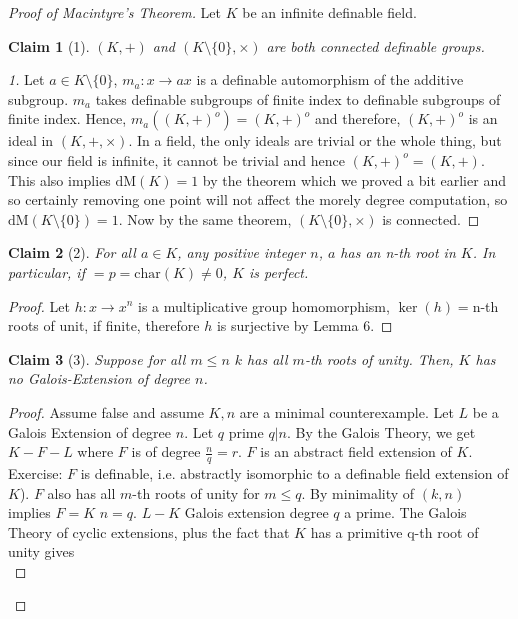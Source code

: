\documentclass[letterpaper, 12pt]{article}
\newcommand{\dM}{\mbox{dM}}
\theoremstyle{stdthm}
\theoremstyle{stddef}
\theoremstyle{stdnonum}
\newtheorem{claim}{Claim}
\theoremstyle{stdqands}
\theoremstyle{stdbold}
\begin{document}
\begin{proof}[Proof of Macintyre's Theorem]
Let $K$ be an infinite definable field. 

\begin{claim}[1]
$(K,+)$ and $(K\setminus\{0\},\times)$ are both connected definable groups. 
\end{claim}

\begin{proof}[1]
Let $a \in K\setminus\{0\}$, $m_a: x\to ax$ is a definable automorphism of the additive subgroup. $m_a$ takes definable subgroups of finite index to definable subgroups of finite index. Hence, $m_a((K,+)^o) = (K,+)^o$ and therefore, $(K,+)^o$ is an ideal in $(K,+,\times)$. In a field, the only ideals are trivial or the whole thing, but since our field is infinite, it cannot be trivial and hence $(K,+)^o = (K,+)$. This also implies $\dM(K) = 1$ by the theorem which we proved a bit earlier and so certainly removing one point will not affect the morely degree computation, so $\dM(K\setminus \{0\}) = 1$. Now by the same theorem, $(K\setminus\{0\},\times)$ is connected.  
\end{proof}

\begin{claim}[2]
For all $a \in K$, any positive integer $n$, $a$ has an n-th root in $K$. In particular, if $ =p = \mbox{char}(K) \neq 0$, $K$ is perfect. 
\end{claim}

\begin{proof}
Let $h:x\to x^n$ is a multiplicative group homomorphism, $\ker(h) = $n-th roots of unit, if finite, therefore $h$ is surjective by Lemma 6. 

\end{proof}


\begin{claim}[3]
Suppose for all $m \leq n$ $k$ has all $m$-th roots of unity. Then, $K$ has no Galois-Extension of degree $n$. 
\end{claim}

\begin{proof}
Assume false and assume $K,n$ are a minimal counterexample. Let $L$ be a Galois Extension of degree $n$. Let $q$ prime $q |n$. By the Galois Theory, we get $K - F -L$ where $F$ is of degree $\frac{n}{q} =r$. $F$ is an abstract field extension of $K$. Exercise: $F$ is definable, i.e. abstractly isomorphic to a definable field extension of $K$). $F$ also has all $m$-th roots of unity for $m\leq q$. By minimality of $(k,n)$ implies $F = K$ $n=q$. $L-K$ Galois extension degree $q$ a prime. The Galois Theory of cyclic extensions, plus the fact that $K$ has a primitive q-th root of unity gives \\


\end{proof}
\end{proof}
\end{document}
